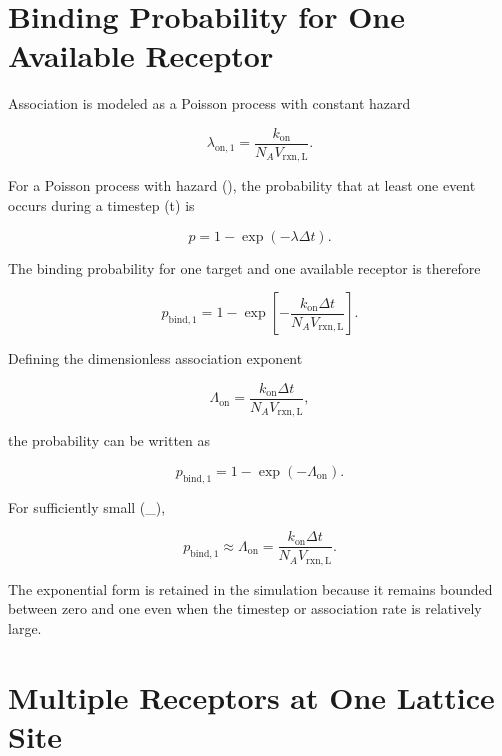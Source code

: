 \documentclass[11pt]{article}
\begin{document}
\section{Binding Probability for One Available Receptor}

Association is modeled as a Poisson process with constant hazard

\begin{equation}
\lambda_{\mathrm{on},1}
=
\frac{k_{\mathrm{on}}}
{N_A V_{\mathrm{rxn,L}}}.
\end{equation}

For a Poisson process with hazard (\lambda), the probability that at least one event occurs during a timestep (\Delta t) is

\begin{equation}
p
=
1-\exp(-\lambda\Delta t).
\end{equation}

The binding probability for one target and one available receptor is therefore

\begin{equation}
\boxed{
p_{\mathrm{bind},1}
=
1-
\exp\left[
-
\frac{
k_{\mathrm{on}}\Delta t
}{
N_A V_{\mathrm{rxn,L}}
}
\right]
}.
\end{equation}

Defining the dimensionless association exponent

\begin{equation}
\Lambda_{\mathrm{on}}
=
\frac{
k_{\mathrm{on}}\Delta t
}{
N_A V_{\mathrm{rxn,L}}
},
\end{equation}

the probability can be written as

\begin{equation}
p_{\mathrm{bind},1}
=
1-\exp(-\Lambda_{\mathrm{on}}).
\end{equation}

For sufficiently small (\Lambda_{}),

\begin{equation}
p_{\mathrm{bind},1}
\approx
\Lambda_{\mathrm{on}}
=
\frac{
k_{\mathrm{on}}\Delta t
}{
N_A V_{\mathrm{rxn,L}}
}.
\end{equation}

The exponential form is retained in the simulation because it remains bounded between zero and one even when the timestep or association rate is relatively large.

\section{Multiple Receptors at One Lattice Site}
\end{document}
